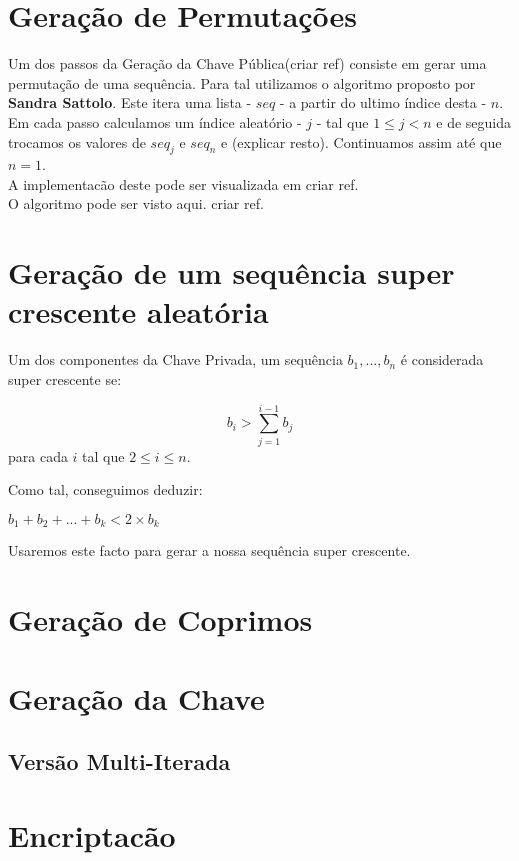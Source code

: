 \documentclass[11pt]{report}
\begin{document}
\section{Geração de Permutações}

Um dos passos da Geração da Chave Pública(criar ref) consiste em gerar uma permutação de uma sequência. Para tal utilizamos o algoritmo proposto por \textbf{Sandra Sattolo}. Este itera uma lista - $seq$ - a partir do ultimo índice desta - $n$. Em cada passo calculamos um índice aleatório - $j$ - tal que $1 \le j < n$ e de seguida trocamos os valores de $seq_j$ e $seq_n$ e (explicar resto). Continuamos assim até que $n = 1$.\\
A implementacão deste pode ser visualizada em criar ref.\\
O algoritmo pode ser visto aqui. criar ref.

\section{Geração de um sequência super crescente aleatória}

Um dos componentes da Chave Privada, um sequência ${b_1, ..., b_n}$ é considerada super crescente se:
\begin{center}
	$$b_i > \sum_{j = 1}^{i - 1} b_j$$ para cada $i$ tal que $2 \le i \le n$. 
\end{center}
Como tal, conseguimos deduzir:
\begin{center}
	$b_1 + b_2 + ... + b_k < 2 \times b_k$
\end{center}
Usaremos este facto para gerar a nossa sequência super crescente.

\section{Geração de Coprimos}

\section{Geração da Chave}

\subsection{Versão Multi-Iterada}

\section{Encriptacão}
\end{document}
